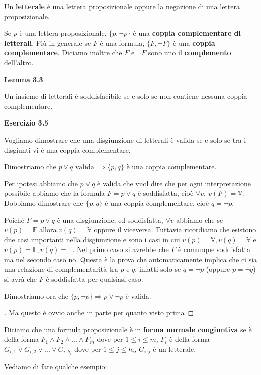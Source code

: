 \begin{flushleft}
Un \textbf{letterale} è una lettera proposizionale oppure la negazione di una 
lettera proposizionale.

Se $p$ è una lettera proposizionale, $\lbrace p, \neg{p} \rbrace$ è una
\textbf{coppia complementare di letterali}. Più in generale se $F$ è una formula, 
$\lbrace F, \neg{F} \rbrace$ è una \textbf{coppia complementare}. Diciamo inoltre
che $F$ e $\neg{F}$ sono uno il \textbf{complemento} dell'altro.

\bigskip

\textbf{Lemma 3.3}

Un insieme di letterali è soddisfacibile se e solo se non contiene nessuna coppia
complementare.

\bigskip

\textbf{Esercizio 3.5}

Vogliamo dimostrare che una disgiunzione di letterali è valida se e solo se tra 
i disgiunti vi è una coppia complementare.

\medskip

Dimostriamo che $p \lor q \text{ valida } \Rightarrow \lbrace p, q \rbrace \text{ è 
una coppia complementare}$.

\smallskip

Per ipotesi abbiamo che $p \lor q$ è valida che vuol dire che per ogni interpretazione 
possibile abbiamo che la formula $F = p \lor q$ è soddisfatta, cioè 
$\forall v, \: v(F) = \mathbb{V}$. Dobbiamo dimostrare che $\lbrace p, q \rbrace$ è 
una coppia complementare, cioè $q = \neg p$.

Poiché $F = p \lor q$ è una disgiunzione, ed soddisfatta, $\forall v$ abbiamo che 
se $v(p) = \mathbb{F}$ allora $v(q) = \mathbb{V}$ oppure il viceversa. Tuttavia ricordiamo
che esistono due casi importanti nella disgiunzione e sono i casi in cui $v(p) = \mathbb{V},
v(q) = \mathbb{V}$ e $v(p) = \mathbb{F}, v(q) = \mathbb{F}$. Nel primo caso si avrebbe che $F$
è comunque soddisfatta ma nel secondo caso no. Questa è la prova che automaticamente
implica che ci sia una relazione di complementarità tra $p$ e $q$, infatti solo se 
$q = \neg p$ (oppure $p = \neg q$) si avrà che $F$ è soddisfatta per qualsiasi caso.

\medskip

Dimostriamo ora che $\lbrace p, \neg p \rbrace \Rightarrow p \lor \neg p$ è valida.

\begin{proof}[\unskip\nopunct]
Ma questo è ovvio anche in parte per quanto visto prima
\end{proof}

\bigskip

Diciamo che una formula proposizionale è in \textbf{forma normale congiuntiva} se
è della forma $F_1 \land F_2 \land ... \land F_m$ dove per $1 \le i \le m$, $F_i$
è della forma $G_{i,1} \lor G_{i,2} \lor ... \lor G_{i,h_i}$ dove per 
$1 \le j \le h_i$, $G_{i, j}$ è un letterale.

Vediamo di fare qualche esempio:

\end{flushleft}